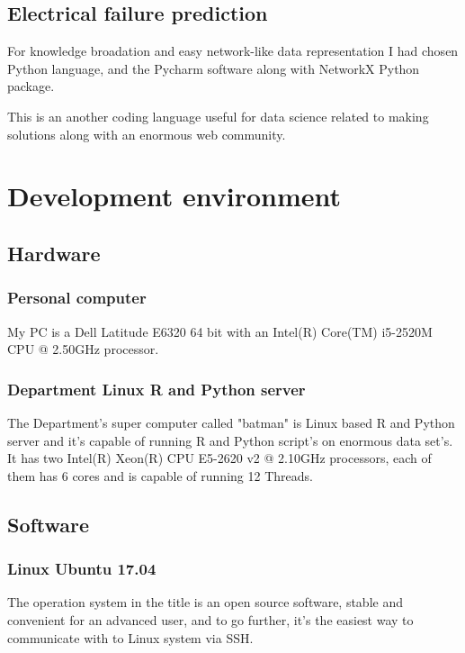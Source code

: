 		\subsection{Electrical failure prediction}
For knowledge broadation and easy network-like data representation I had chosen Python language, and the Pycharm software \cite{PyCharm} along with NetworkX Python package\cite{NetworkX}.

This is an another coding language useful for data science related to making solutions along with an enormous web community.
	\section{Development environment}
		\subsection{Hardware}
			\subsubsection{Personal computer}
My PC is a Dell Latitude E6320 64 bit with an Intel(R) Core(TM) i5-2520M CPU @ 2.50GHz processor.
\cite{Latitude}
			\subsubsection{Department Linux R and Python server}
The Department's super computer called "batman" is Linux based R and Python server and it's capable of running R and Python script's on enormous data set's. It has two Intel(R) Xeon(R) CPU E5-2620 v2 @ 2.10GHz processors, each of them has 6 cores and is capable of running 12 Threads.
\cite{Batman}
		\subsection{Software}
			\subsubsection{Linux Ubuntu 17.04}
The operation system in the title is an open source software, stable and convenient for an advanced user, and to go further, it's the easiest way to communicate with to Linux system via SSH.
\cite{Ubuntu}
